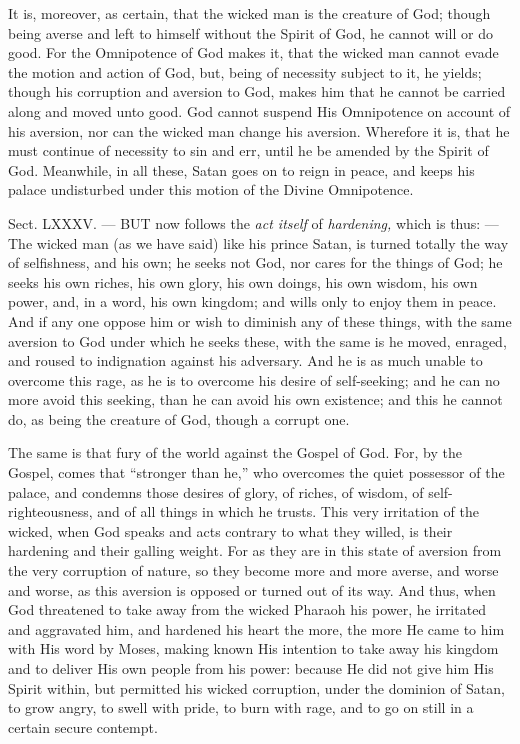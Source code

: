It is, moreover, as certain, that the wicked man is the creature of God; though being averse and left to himself without the Spirit of God, he cannot will or do good. For the Omnipotence of God makes it, that the wicked man cannot evade the motion and action of God, but, being of necessity subject to it, he yields; though his corruption and aversion to God, makes him that he cannot be carried along and moved unto good. God cannot suspend His Omnipotence on account of his aversion, nor can the wicked man change his aversion. Wherefore it is, that he must continue of necessity to sin and err, until he be amended by the Spirit of God. Meanwhile, in all these, Satan goes on to reign in peace, and keeps his palace undisturbed under this motion of the Divine Omnipotence.


Sect. LXXXV. — BUT now follows the \emph{act itself }of \emph{hardening, }which is thus: — The wicked man (as we have said) like his prince Satan, is turned totally the way of selfishness, and his own; he seeks not God, nor cares for the things of God; he seeks his own riches, his own glory, his own doings, his own wisdom, his own power, and, in a word, his own kingdom; and wills only to enjoy them in peace. And if any one oppose him or wish to diminish any of these things, with the same aversion to God under which he seeks these, with the same is he moved, enraged, and roused to indignation against his adversary. And he is as much unable to overcome this rage, as he is to overcome his desire of self-seeking; and he can no more avoid this seeking, than he can avoid his own existence; and this he cannot do, as being the creature of God, though a corrupt one.

The same is that fury of the world against the Gospel of God. For, by the Gospel, comes that “stronger than he,” who overcomes the quiet possessor of the palace, and condemns those desires of glory, of riches, of wisdom, of self-righteousness, and of all things in which he trusts. This very irritation of the wicked, when God speaks and acts contrary to what they willed, is their hardening and their galling weight. For as they are in this state of aversion from the very corruption of nature, so they become more and more averse, and worse and worse, as this aversion is opposed or turned out of its way. And thus, when God threatened to take away from the wicked Pharaoh his power, he irritated and aggravated him, and hardened his heart the more, the more He came to him with His word by Moses, making known His intention to take away his kingdom and to deliver His own people from his power: because He did not give him His Spirit within, but permitted his wicked corruption, under the dominion of Satan, to grow angry, to swell with pride, to burn with rage, and to go on still in a certain secure contempt.

